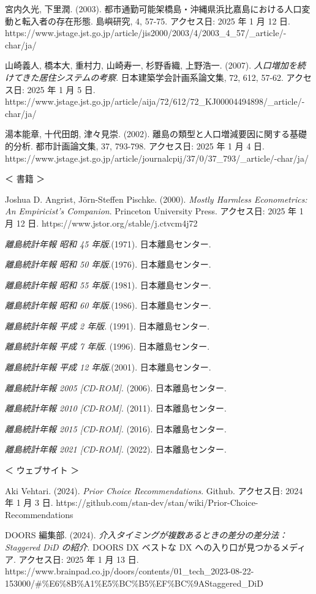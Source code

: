 宮内久光, 下里潤. (2003).
都市通勤可能架橋島・沖縄県浜比嘉島における人口変動と転入者の存在形態.
島嶼研究, 4, 57-75. アクセス日: 2025 年 1 月 12 日.
https://www.jstage.jst.go.jp/article/jis2000/2003/4/2003\_4\_57/\_article/-char/ja/

山崎義人, 橋本大, 重村力, 山崎寿一, 杉野香織, 上野浩一. (2007).
\emph{人口増加を続けてきた居住システムの考察}. 日本建築学会計画系論文集,
72, 612, 57-62. アクセス日: 2025 年 1 月 5 日.
https://www.jstage.jst.go.jp/article/aija/72/612/72\_KJ00004494898/\_article/-char/ja/

湯本能章, 十代田朗, 津々見崇. (2002).
離島の類型と人口増減要因に関する基礎的分析. 都市計画論文集, 37, 793-798.
アクセス日: 2025 年 1 月 4 日.
https://www.jstage.jst.go.jp/article/journalcpij/37/0/37\_793/\_article/-char/ja/

＜ 書籍 ＞

Joshua D. Angrist, Jörn-Steffen Pischke. (2000). \emph{Mostly Harmless
Econometrics: An Empiricist's Companion}. Princeton University Press.
アクセス日: 2025 年 1 月 12 日. https://www.jstor.org/stable/j.ctvcm4j72

\emph{離島統計年報 昭和 45 年版}.(1971). 日本離島センター.

\emph{離島統計年報 昭和 50 年版}.(1976). 日本離島センター.

\emph{離島統計年報 昭和 55 年版}.(1981). 日本離島センター.

\emph{離島統計年報 昭和 60 年版}.(1986). 日本離島センター.

\emph{離島統計年報 平成 2 年版}. (1991). 日本離島センター.

\emph{離島統計年報 平成 7 年版}. (1996). 日本離島センター.

\emph{離島統計年報 平成 12 年版}.(2001). 日本離島センター.

\emph{離島統計年報 2005 {[}CD-ROM{]}}. (2006). 日本離島センター.

\emph{離島統計年報 2010 {[}CD-ROM{]}}. (2011). 日本離島センター.

\emph{離島統計年報 2015 {[}CD-ROM{]}}. (2016). 日本離島センター.

\emph{離島統計年報 2021 {[}CD-ROM{]}}. (2022). 日本離島センター.

＜ ウェブサイト ＞

Aki Vehtari. (2024). \emph{Prior Choice Recommendations}. Github.
アクセス日: 2024 年 1 月 3 日.
https://github.com/stan-dev/stan/wiki/Prior-Choice-Recommendations

DOORS 編集部. (2024).
\emph{介入タイミングが複数あるときの差分の差分法：Staggered DiD の紹介}.
DOORS DX \textbar{} ベストな DX への入り口が見つかるメディア.
アクセス日: 2025 年 1 月 13 日.
https://www.brainpad.co.jp/doors/contents/01\_tech\_2023-08-22-153000/\#\%E6\%8B\%A1\%E5\%BC\%B5\%EF\%BC\%9AStaggered\_DiD

